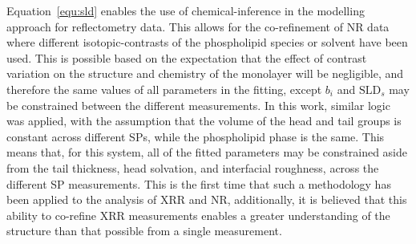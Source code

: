 Equation~\ref{equ:sld} enables the use of chemical-inference in the modelling approach for reflectometry data.
This allows for the co-refinement of NR data where different isotopic-contrasts of the phospholipid species or solvent have been used.
This is possible based on the expectation that the effect of contrast variation on the structure and chemistry of the monolayer will be negligible, and therefore the same values of all parameters in the fitting, except $b_i$ and $\text{SLD}_s$ may be constrained between the different measurements.\autocite{hollinshead_effects_2009}
In this work, similar logic was applied, with the assumption that the volume of the head and tail groups is constant across different SPs, while the phospholipid phase is the same.
This means that, for this system, all of the fitted parameters may be constrained aside from the tail thickness, head solvation, and interfacial roughness, across the different SP measurements.
This is the first time that such a methodology has been applied to the analysis of XRR and NR, additionally, it is believed that this ability to co-refine XRR measurements enables a greater understanding of the structure than that possible from a single measurement.
